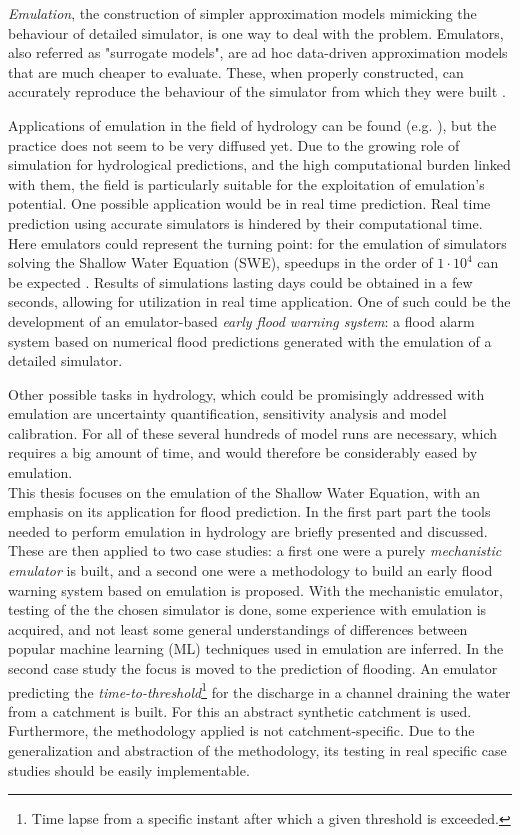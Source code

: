 \emph{Emulation}, the construction of simpler approximation models mimicking the behaviour of detailed simulator, is one way to deal with the problem.
{Emulators}, also referred as "surrogate models", are ad hoc data-driven approximation models that are much cheaper to evaluate.
These, when properly constructed, can accurately reproduce the behaviour of the simulator from which they were built \autocite{gorissen_surrogate_2010}.

Applications of emulation in the field of hydrology can be found (e.g. \citet{machac_emulation_2016}), but the practice does not seem to be very diffused yet.
Due to the growing role of simulation for hydrological predictions, and the high computational burden linked with them, the field is particularly suitable for the exploitation of emulation's potential.
One possible application would be in real time prediction.
Real time prediction using accurate simulators is hindered by their computational time.
Here emulators could represent the turning point: for the emulation of simulators solving the Shallow Water Equation (SWE), speedups in the order of $1\cdot 10^4$ can be expected \autocite{carbajal_appraisal_2016}.
Results of simulations lasting days could be obtained in a few seconds, allowing for utilization in real time application.
One of such could be the development of an emulator-based \emph{early flood warning system}: a flood alarm system based on numerical flood predictions generated with the emulation of a detailed simulator.

Other possible tasks in hydrology, which could be promisingly addressed with emulation are uncertainty quantification, sensitivity analysis and model calibration.
For all of these several hundreds of model runs are necessary, which requires a big amount of time, and would therefore be considerably eased by emulation.\\

This thesis focuses on the emulation of the Shallow Water Equation, with an emphasis on its application for flood prediction.
In the first part part the tools needed to perform emulation in hydrology are briefly presented and discussed.
These are then applied to two case studies: a first one were a purely \emph{mechanistic emulator} is built, and a second one were a methodology to build an early flood warning system based on emulation is proposed.
With the mechanistic emulator, testing of the the chosen simulator is done, some experience with emulation is acquired, and not least some general understandings of differences between popular machine learning (ML) techniques used in emulation are inferred.
In the second case study the focus is moved to the prediction of flooding.
An emulator predicting the \emph{time-to-threshold}\footnote{Time lapse from a specific instant after which a given threshold is exceeded.} for the discharge in a channel draining the water from a catchment is built.
For this an abstract synthetic catchment is used.
Furthermore, the methodology applied is not catchment-specific.
Due to the generalization and abstraction of the methodology, its testing in real specific case studies should be easily implementable.

